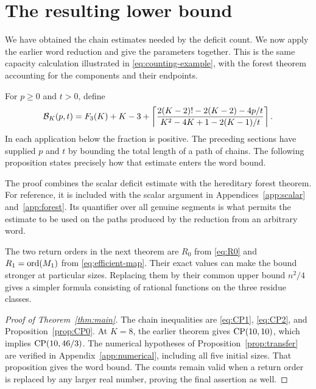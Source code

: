 \section{The resulting lower bound}

We have obtained the chain estimates needed by the deficit count. We now
apply the earlier word reduction and give the parameters together. This
is the same capacity calculation illustrated in \eqref{eq:counting-example},
with the forest theorem accounting for the components and their endpoints.

For $p\ge0$ and $t>0$, define
\begin{equation}\label{eq:bound}
 \mathcal B_K(p,t)=F_3(K)+K-3+
 \left\lceil \frac{2(K-2)!-2(K-2)-4p/t}
 {K^2-4K+1-2(K-1)/t}\right\rceil.
\end{equation}
In each application below the fraction is positive. The preceding
sections have supplied $p$ and $t$ by bounding the total length of a path
of chains. The following proposition states precisely how that estimate
enters the word bound.



The proof combines the scalar deficit estimate with the hereditary
forest theorem. For reference, it is included with the scalar argument
in Appendices~\ref{app:scalar} and~\ref{app:forest}. Its quantifier over all genuine segments
is what permits the estimate to be used on the paths produced by the
reduction from an arbitrary word.

The two return orders in the next theorem are $R_0$ from
\eqref{eq:R0} and $R_1=\operatorname{ord}(M_1)$ from \eqref{eq:efficient-map}.
Their exact values can make the bound stronger at particular sizes.
Replacing them by their common upper bound $n^2/4$ gives a simpler
formula consisting of rational functions on the three residue classes.



\begin{proof}[Proof of Theorem~\ref{thm:main}]
The chain inequalities are \eqref{eq:CP1}, \eqref{eq:CP2}, and
Proposition~\ref{prop:CP0}. At $K=8$, the earlier theorem gives
$\operatorname{CP}(10,10)$, which implies $\operatorname{CP}(10,46/3)$.
The numerical hypotheses of Proposition~\ref{prop:transfer} are verified
in Appendix~\ref{app:numerical}, including all five initial sizes.
That proposition gives the word bound. The counts remain valid when a
return order is replaced by any larger real number, proving the final
assertion as well.
\end{proof}

